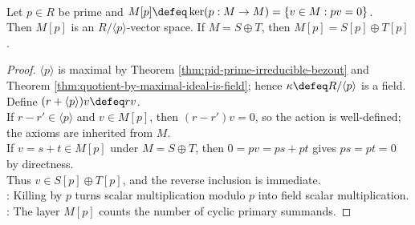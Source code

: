 \begin{lemma} \label{lem:p-torsion-layer-vector-space} \\
Let $p\in R$ be prime and $M[p]\defeq\ker(p:M\to M)=\{v\in M:pv=0\}$.\\
Then $M[p]$ is an $R/\langle p\rangle$-vector space. If $M=S\oplus T$, then $M[p]=S[p]\oplus T[p]$.
\begin{proof} $\langle p\rangle$ is maximal by Theorem \ref{thm:pid-prime-irreducible-bezout} and Theorem \ref{thm:quotient-by-maximal-ideal-is-field}; hence $\kappa\defeq R/\langle p\rangle$ is a field. Define $(r+\langle p\rangle)v\defeq rv$.\\
If $r-r'\in\langle p\rangle$ and $v\in M[p]$, then $(r-r')v=0$, so the action is well-defined; the axioms are inherited from $M$.\\
If $v=s+t\in M[p]$ under $M=S\oplus T$, then $0=pv=ps+pt$ gives $ps=pt=0$ by directness.\\
Thus $v\in S[p]\oplus T[p]$, and the reverse inclusion is immediate.\\
: Killing by $p$ turns scalar multiplication modulo $p$ into field scalar multiplication.\\
: The layer $M[p]$ counts the number of cyclic primary summands.
\end{proof}
\end{lemma}

